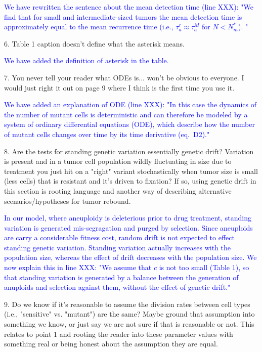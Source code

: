 \documentclass[12pt]{extarticle}
\begin{document}
\textcolor{blue}{%
We have rewritten the sentence about the mean detection time (line XXX): "We find that for small and intermediate-sized tumors the mean detection time is approximately equal to the mean recurrence time (i.e., $\tau_a^r\approx\tau_a^{M}$ for $N<N_m^*$). "
} 

6. Table 1 caption doesn't define what the asterisk means.

\textcolor{blue}{ %
We have added the definition of asterisk in the table.
} 

7. You never tell your reader what ODEs is... won't be obvious to everyone. I would just right it out on page 9 where I think is the first time you use it.

\textcolor{blue}{%
We have added an explanation of ODE (line XXX): "In this case the dynamics of the number of mutant cells is deterministic and can therefore be modeled by a system of ordinary differential equations (ODE), which describe how the number of mutant cells changes over time by its time derivative (eq.~D2)."
} 

8. Are the tests for standing genetic variation essentially genetic drift? Variation is present and in a tumor cell population wildly fluctuating in size due to treatment you just hit on a "right" variant stochastically when tumor size is small (less cells) that is resistant and it's driven to fixation? If so, using genetic drift in this section is rooting language and another way of describing alternative scenarios/hypotheses for tumor rebound.

\textcolor{blue}{In our model, where aneuploidy is deleterious prior to drug treatment, standing variation is generated mis-segragation and purged by selection. Since aneuploids are carry a considerable fitness cost, random drift is not expected to effect standing genetic variation. Standing variation actually increases with the population size, whereas the effect of drift decreases with the population size. We now explain this in line XXX: "We assume that $c$ is not too small (Table 1), so that standing variation is generated by a balance between the generation of anuploids and selection against them, without the effect of genetic drift."
} 

9. Do we know if it's reasonable to assume the division rates between cell types (i.e., "sensitive" vs. "mutant") are the same? Maybe ground that assumption into something we know, or just say we are not sure if that is reasonable or not. This relates to point 1 and rooting the reader into these parameter values with something real or being honest about the assumption they are equal.
\end{document}
